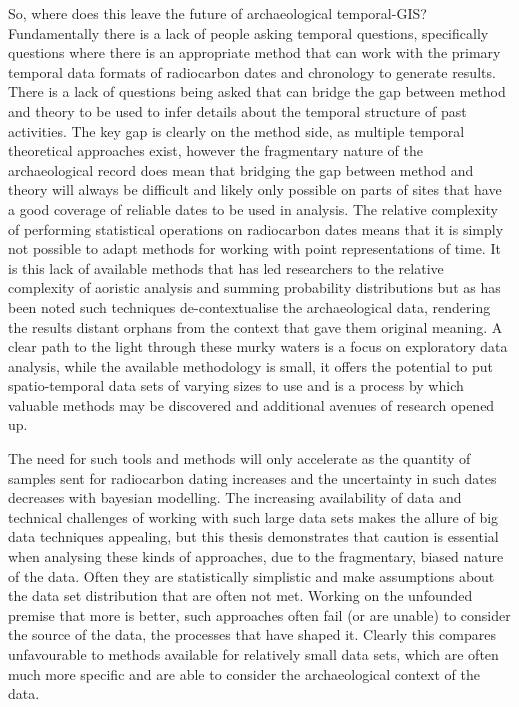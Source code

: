 So, where does this leave the future of archaeological temporal-GIS? Fundamentally there is a lack of people asking temporal questions, specifically questions where there is an appropriate method that can work with the primary temporal data formats of radiocarbon dates and chronology to generate results. There is a lack of questions being asked that can bridge the gap between method and theory to be used to infer details about the temporal structure of past activities. The key gap is clearly on the method side, as multiple temporal theoretical approaches exist, however the fragmentary nature of the archaeological record does mean that bridging the gap between method and theory will always be difficult and likely only possible on parts of sites that have a good coverage of reliable dates to be used in analysis. The relative complexity of performing statistical operations on radiocarbon dates means that it is simply not possible to adapt methods for working with point representations of time. It is this lack of available methods that has led researchers to the relative complexity of aoristic analysis and summing probability distributions but as has been noted such techniques de-contextualise the archaeological data, rendering the results distant orphans from the context that gave them original meaning. A clear path to the light through these murky waters is a focus on exploratory data analysis, while the available methodology is small, it offers the potential to put spatio-temporal data sets of varying sizes to use and is a process by which valuable methods may be discovered and additional avenues of research opened up.

The need for such tools and methods will only accelerate as the quantity of samples sent for radiocarbon dating increases and the uncertainty in such dates decreases with bayesian modelling. The increasing availability of data and technical challenges of working with such large data sets makes the allure of big data techniques appealing, but this thesis demonstrates that caution is essential when analysing these kinds of approaches, due to the fragmentary, biased nature of the data. Often they are statistically simplistic \citep[8]{donoho201550} and make assumptions about the data set distribution that are often not met. Working on the unfounded premise that more is better, such approaches often fail (or are unable) to consider the source of the data, the processes that have shaped it. Clearly this compares unfavourable to methods available for relatively small data sets, which are often much more specific and are able to consider the archaeological context of the data. 

